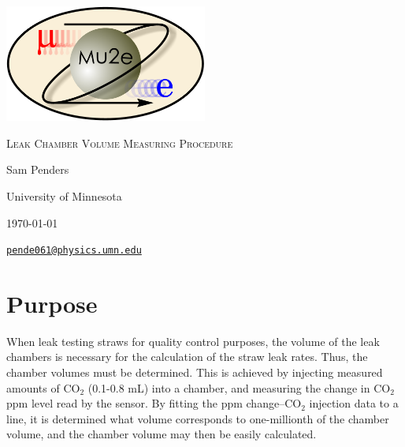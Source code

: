 \documentclass[letterpaper,12pt]{article}
\begin{document}
\begin{titlepage}
	\centering
	\includegraphics[width=0.5\textwidth]{mu2e_logo_oval.png}\par\vspace{2cm}
	{\scshape\LARGE Leak Chamber Volume Measuring Procedure\par}
	\vspace{3cm}
	{\Large Sam Penders\par}
	\vspace{3cm}
	{\large University of Minnesota\par}
 	\vspace{.5cm}
	{\large \today \par}
	\vfill
	{\par}
	\href{mailto:pende061@physics.umn.edu}{\tt{pende061@physics.umn.edu}}
\end{titlepage}

\clearpage
\setcounter{page}{2}

\section{Purpose}
When leak testing straws for quality control purposes, the volume of the leak chambers is necessary for the calculation of the straw leak rates. Thus, the chamber volumes must be determined. This is achieved by injecting measured amounts of CO$_2$ (0.1-0.8 mL) into a chamber, and measuring the change in CO$_2$ ppm level read by the sensor. By fitting the ppm change--CO$_2$ injection data to a line, it is determined what volume corresponds to one-millionth of the chamber volume, and the chamber volume may then be easily calculated.
\end{document}
